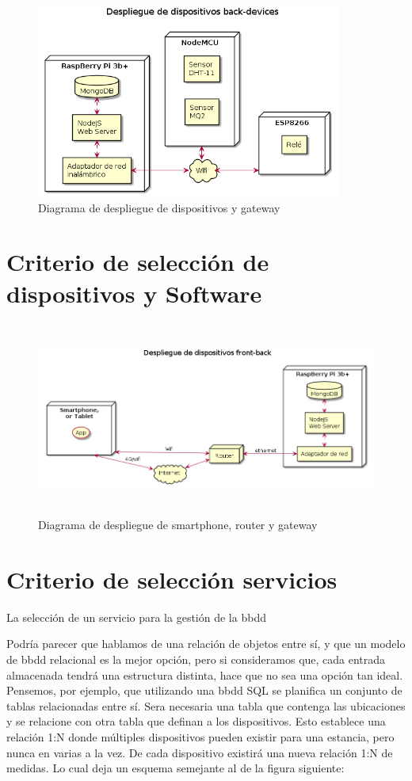 \begin{figure}[hbt!]
\centering
\includegraphics[height=2.5in]{figures/diagrams/physical-devices/back-devices.png}
\caption[Diagrama de despliegue de back-end]{Diagrama de despliegue de dispositivos y gateway\footnotemark}
\end{figure}

\section{Criterio de selección de dispositivos y Software}
\label{makereference4.3}

\begin{figure}[hbt!]
\centering
\includegraphics[height=2.5in]{figures/diagrams/physical-devices/front-back.png}
\caption[Despligue de front]{Diagrama de despliegue de smartphone, router y gateway\footnotemark}
\end{figure}

\section{Criterio de selección servicios}
\label{makereference4.4}
La selección de un servicio para la gestión de la \gls{bbdd}


Podría parecer que hablamos de una relación de objetos entre sí, y que un modelo de \gls{bbdd} relacional es la mejor opción, pero si consideramos que, cada entrada almacenada tendrá una estructura distinta, hace que no sea una opción tan ideal. Pensemos, por ejemplo, que utilizando una \gls{bbdd} SQL se planifica un conjunto de tablas relacionadas entre sí. Sera necesaria una tabla que contenga las ubicaciones y se relacione con otra tabla que definan a los dispositivos. Esto establece una relación 1:N donde múltiples dispositivos pueden existir para una estancia, pero nunca en varias a la vez. De cada dispositivo existirá una nueva relación 1:N de medidas. Lo cual deja un esquema semejante al de la figura siguiente:


